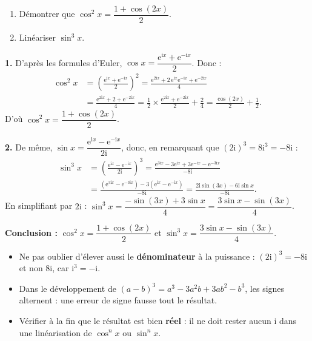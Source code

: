 \documentclass[11pt]{article}
\begin{document}
\begin{exoresolu}
\begin{enumerate}
\item Démontrer que $\cos^2 x = \dfrac{1 + \cos(2x)}{2}$.
\item Linéariser $\sin^3 x$.
\end{enumerate}
\tcblower
\textbf{1.} D'après les formules d'Euler, $\cos x = \dfrac{\mathrm{e}^{\mathrm{i}x}+\mathrm{e}^{-\mathrm{i}x}}{2}$. Donc :
\begin{align*}
\cos^2 x &= \left(\frac{\mathrm{e}^{\mathrm{i}x}+\mathrm{e}^{-\mathrm{i}x}}{2}\right)^2 = \frac{\mathrm{e}^{2\mathrm{i}x} + 2\,\mathrm{e}^{\mathrm{i}x}\mathrm{e}^{-\mathrm{i}x} + \mathrm{e}^{-2\mathrm{i}x}}{4} \\
&= \frac{\mathrm{e}^{2\mathrm{i}x} + 2 + \mathrm{e}^{-2\mathrm{i}x}}{4} = \frac{1}{2}\times\frac{\mathrm{e}^{2\mathrm{i}x}+\mathrm{e}^{-2\mathrm{i}x}}{2} + \frac{2}{4} = \frac{\cos(2x)}{2} + \frac{1}{2}.
\end{align*}
D'où $\cos^2 x = \dfrac{1+\cos(2x)}{2}$.

\textbf{2.} De même, $\sin x = \dfrac{\mathrm{e}^{\mathrm{i}x}-\mathrm{e}^{-\mathrm{i}x}}{2\mathrm{i}}$, donc, en remarquant que $(2\mathrm{i})^3 = 8\mathrm{i}^3 = -8\mathrm{i}$ :
\begin{align*}
\sin^3 x &= \left(\frac{\mathrm{e}^{\mathrm{i}x}-\mathrm{e}^{-\mathrm{i}x}}{2\mathrm{i}}\right)^3 = \frac{\mathrm{e}^{3\mathrm{i}x} - 3\mathrm{e}^{\mathrm{i}x} + 3\mathrm{e}^{-\mathrm{i}x} - \mathrm{e}^{-3\mathrm{i}x}}{-8\mathrm{i}} \\
&= \frac{\left(\mathrm{e}^{3\mathrm{i}x}-\mathrm{e}^{-3\mathrm{i}x}\right) - 3\left(\mathrm{e}^{\mathrm{i}x}-\mathrm{e}^{-\mathrm{i}x}\right)}{-8\mathrm{i}} = \frac{2\mathrm{i}\sin(3x) - 6\mathrm{i}\sin x}{-8\mathrm{i}}.
\end{align*}
En simplifiant par $2\mathrm{i}$ : $\sin^3 x = \dfrac{-\sin(3x) + 3\sin x}{4} = \dfrac{3\sin x - \sin(3x)}{4}$.

\textbf{Conclusion :} $\cos^2 x = \dfrac{1+\cos(2x)}{2}$ et $\sin^3 x = \dfrac{3\sin x - \sin(3x)}{4}$.
\end{exoresolu}

\begin{attention}
\begin{itemize}
\item Ne pas oublier d'élever aussi le \textbf{dénominateur} à la puissance : $(2\mathrm{i})^3 = -8\mathrm{i}$ et non $8\mathrm{i}$, car $\mathrm{i}^3 = -\mathrm{i}$.
\item Dans le développement de $(a-b)^3 = a^3 - 3a^2b + 3ab^2 - b^3$, les signes alternent : une erreur de signe fausse tout le résultat.
\item Vérifier à la fin que le résultat est bien \textbf{réel} : il ne doit rester aucun $\mathrm{i}$ dans une linéarisation de $\cos^n x$ ou $\sin^n x$.
\end{itemize}
\end{attention}
\end{document}
